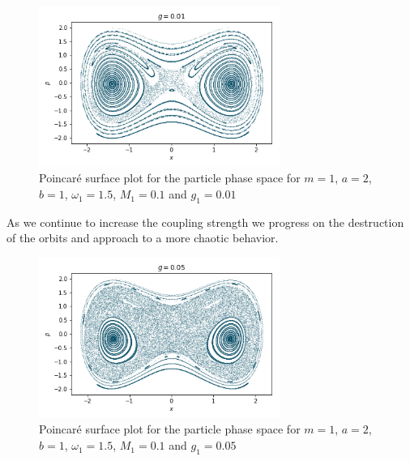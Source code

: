 \begin{figure}[H]
\centering
\includegraphics[width=0.7\textwidth]{Figures/poincare_g001.png}
\caption{Poincaré surface plot for the particle phase space for $m=1$, $a=2$, $b=1$, $\omega_1=1.5$, $M_1=0.1$ and $g_1=0.01$\label{fig:poinc_g001}
}
\end{figure}
As we continue to increase the coupling strength we progress on the destruction of the orbits and approach to a more chaotic behavior.

\begin{figure}[H]
\centering
\includegraphics[width=0.7\textwidth]{Figures/poincare_g005.png}
\caption{Poincaré surface plot for the particle phase space for $m=1$, $a=2$, $b=1$, $\omega_1=1.5$, $M_1=0.1$ and $g_1=0.05$\label{fig:poinc_g005}
}
\end{figure}

